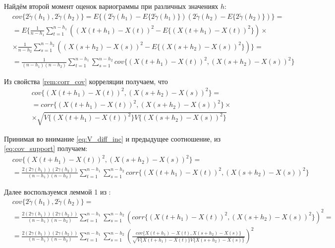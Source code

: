 Найдём второй момент оценок вариограммы при различных значениях $h$:
\begin{eqnarray}
\label{eq:cov_support}
\nonumber
	& cov\{ 2 \tilde{\gamma}(h_1), 2 \tilde{\gamma}(h_2) \} = E\{ (2 \tilde{\gamma}(h_1) - E\{ 2 \tilde{\gamma}(h_1) \}) (2 \tilde{\gamma}(h_2) - E\{ 2 \tilde{\gamma}(h_2) \}) \} = \\
\nonumber
	& = E\{ \frac{1}{n - h_1} \sum_{t = 1}^{n - h_1}((X(t + h_1) - X(t))^2 - E\{ (X(t + h_1) - X(t))^2 \}) \times \\
\nonumber
	& \times \frac{1}{n - h_2} \sum_{s = 1}^{n - h_2}((X(s + h_2) - X(s))^2 - E\{ (X(s + h_2) - X(s))^2 \}) \} = \\
	& = \frac{1}{(n - h_1)(n - h_2)} \sum_{t = 1}^{n - h_1}\sum_{s = 1}^{n - h_2} cov\{ (X(t + h_1) - X(t))^2, (X(s + h_2) - X(s))^2 \}
\end{eqnarray}

Из свойства \ref{rem:corr_cov} корреляции получаем, что
\begin{eqnarray*}
	& cov\{ (X(t + h_1) - X(t))^2, (X(s + h_2) - X(s))^2 \} = \\
	& = corr\{(X(t + h_1) - X(t))^2, (X(s + h_2) - X(s))^2 \} \times \\
	& \times \sqrt{V\{ (X( t + h_1) - X(t))^2 \} V\{ (X(s + h_2) - X(s))^2 \}}
\end{eqnarray*}

Принимая во внимание \eqref{eq:V_diff_inc} и предыдущее соотношение, из \eqref{eq:cov_support} получаем:
\begin{eqnarray*}
	& cov\{ (X(t + h_1) - X(t))^2, (X(s + h_2) - X(s))^2 \} = \\
	& = \frac{2 (2\gamma(h_1))(2\gamma(h_2))}{(n - h_1)(n - h_2)}\sum_{t = 1}^{n - h_1}\sum_{s = 1}^{n - h_2} corr\{(X(t + h_1) - X(t))^2, (X(s + h_2) - X(s))^2 \}
\end{eqnarray*}

Далее воспользуемся леммой 1 из \cite{tsekhavaya-brest}:
\begin{eqnarray*}
	& cov\{ 2 \tilde{\gamma}(h_1), 2 \tilde{\gamma}(h_2) \} = \\
	& = \frac{2 (2\gamma(h_1))(2\gamma(h_2))}{(n - h_1)(n - h_2)}\sum_{t = 1}^{n - h_1}\sum_{s = 1}^{n - h_2} (corr\{(X(t + h_1) - X(t))^2, (X(s + h_2) - X(s))^2 \})^2 = \\
	& = \frac{2 (2\gamma(h_1))(2\gamma(h_2))}{(n - h_1)(n - h_2)}\sum_{t = 1}^{n - h_1}\sum_{s = 1}^{n - h_2} ( \frac{cov\{ X(t + h_1) - X(t), X(s + h_2) - X(s) \}}{\sqrt{V\{ X( t + h_1) - X(t) \} V\{ X(s + h_2) - X(s) \}}} )^2
\end{eqnarray*}

